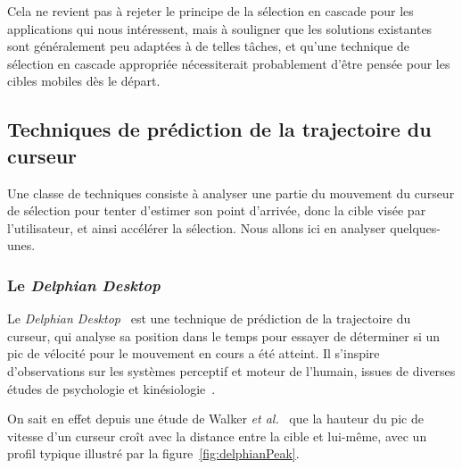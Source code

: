 	Cela ne revient pas à rejeter le principe de la sélection en cascade pour les applications qui nous intéressent, mais à souligner que les solutions existantes sont généralement peu adaptées à de telles tâches, et qu'une technique de sélection en cascade appropriée nécessiterait probablement d'être pensée pour les cibles mobiles dès le départ.
	
	\subsection{Techniques de prédiction de la trajectoire du curseur}
	Une classe de techniques consiste à analyser une partie du mouvement du curseur de sélection pour tenter d'estimer son point d'arrivée, donc la cible visée par l'utilisateur, et ainsi accélérer la sélection. Nous allons ici en analyser quelques-unes.
	
	\subsubsection{Le \emph{Delphian Desktop}}
	Le \emph{Delphian Desktop}~\cite{asano2005predictive} est une technique de prédiction de la trajectoire du curseur, qui analyse sa position dans le temps pour essayer de déterminer si un pic de vélocité pour le mouvement en cours a été atteint. Il s'inspire d'observations sur les systèmes perceptif et moteur de l'humain, issues de diverses études de psychologie et kinésiologie~\cite{accot2003refining, graham1995pointing, graham1996physical, mackenzie1992extending, mackenzie1994prediction, takagi2002fundamental, walker1993spatial}.
	
	On sait en effet depuis une étude de Walker \emph{et al.}~\cite{walker1993spatial} que la hauteur du pic de vitesse d'un curseur croît avec la distance entre la cible et lui-même, avec un profil typique illustré par la figure~\ref{fig:delphianPeak}.


